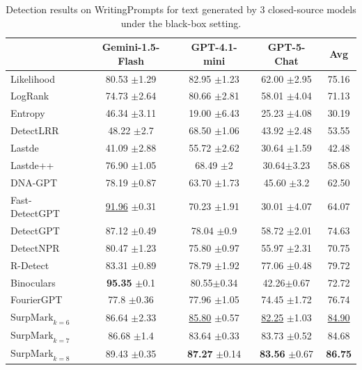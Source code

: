 \documentclass{article}
\newcommand{\com}[1]{\tiny$\pm$#1}
\theoremstyle{plain}
\theoremstyle{definition}
\theoremstyle{remark}
\begin{document}
\begin{table}[htbp]
\centering
{\scriptsize
\begin{tabular}{lcccc}
\toprule
& Gemini-1.5-Flash & GPT-4.1-mini & GPT-5-Chat & Avg  \\
\midrule
Likelihood & 80.53 \com 1.29 & 82.95 \com 1.23 & 62.00 \com 2.95 & 75.16 \\

LogRank & 74.73 \com 2.64 & 80.66 \com 2.81 & 58.01 \com 4.04 & 71.13 \\

Entropy & 46.34 \com 3.11 & 19.00 \com 6.43 & 25.23 \com 4.08 & 30.19 \\

DetectLRR & 48.22 \com 2.7 & 68.50 \com 1.06& 43.92 \com 2.48 & 53.55 \\

Lastde & 41.09 \com 2.88 & 55.72 \com 2.62& 30.64 \com 1.59 & 42.48 \\

Lastde++ & 76.90 \com 1.05 & 68.49 \com 2 & 30.64\com 3.23 & 58.68 \\

DNA-GPT & 78.19 \com 0.87 & 63.70 \com 1.73 & 45.60 \com 3.2 & 62.50 \\

Fast-DetectGPT & \underline{91.96} \com 0.31 & 70.23 \com 1.91& 30.01 \com 4.07 & 64.07 \\

DetectGPT & 87.12 \com 0.49& 78.04 \com 0.9 & 58.72 \com 2.01  & 74.63 \\

DetectNPR & 80.47  \com 1.23 & 75.80 \com 0.97 & 55.97 \com 2.31& 70.75 \\

R-Detect &83.31  \com 0.89 & 78.79 \com 1.92 & 77.06 \com 0.48& 79.72 \\

Binoculars & \textbf{95.35}  \com 0.1 &  80.55\com 0.34 & 42.26\com 0.67 & 72.72 \\

FourierGPT &  77.8 \com 0.36 &  77.96 \com 1.05 & 74.45 \com 1.72 & 76.74 \\

\rowcolor{ours}$\text{SurpMark}_{k=6}$ & 86.64 \com 2.33 & \underline{85.80} \com 0.57 & \underline{82.25} \com 1.03 & \underline{84.90} \\

\rowcolor{ours}$\text{SurpMark}_{k=7}$ & 86.68 \com 1.4 & 83.64 \com 0.33 & 83.73 \com 0.52 & 84.68 \\

\rowcolor{ours}$\text{SurpMark}_{k=8}$ & {89.43} \com 0.35 & \textbf{87.27} \com 0.14 & \textbf{83.56} \com 0.67 & \textbf{86.75} \\
\bottomrule
\end{tabular}}
\caption{Detection results on WritingPrompts for text generated by 3 closed-source models under the black-box setting.}
\label{tab:closesource-writing}
\end{table}
\end{document}
